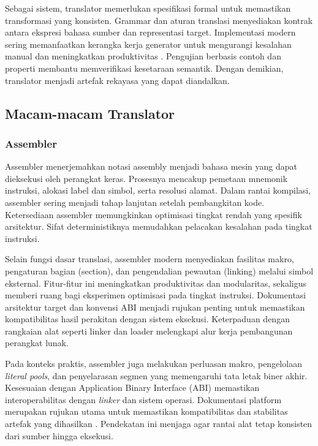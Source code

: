 \documentclass[../main.tex]{subfiles}
\begin{document}
Sebagai sistem, translator memerlukan spesifikasi formal untuk memastikan transformasi yang konsisten. Grammar dan aturan translasi menyediakan kontrak antara ekspresi bahasa sumber dan representasi target. Implementasi modern sering memanfaatkan kerangka kerja generator untuk mengurangi kesalahan manual dan meningkatkan produktivitas \citep{BisonManual,FlexManual,ANTLRDocs}. Pengujian berbasis contoh dan properti membantu memverifikasi kesetaraan semantik. Dengan demikian, translator menjadi artefak rekayasa yang dapat diandalkan.

\subsection{Macam-macam Translator}
\subsubsection{Assembler}
Assembler menerjemahkan notasi assembly menjadi bahasa mesin yang dapat dieksekusi oleh perangkat keras. Prosesnya mencakup pemetaan mnemonik instruksi, alokasi label dan simbol, serta resolusi alamat. Dalam rantai kompilasi, assembler sering menjadi tahap lanjutan setelah pembangkitan kode. Ketersediaan assembler memungkinkan optimisasi tingkat rendah yang spesifik arsitektur. Sifat deterministiknya memudahkan pelacakan kesalahan pada tingkat instruksi.

Selain fungsi dasar translasi, assembler modern menyediakan fasilitas makro, pengaturan bagian (section), dan pengendalian pewautan (linking) melalui simbol eksternal. Fitur-fitur ini meningkatkan produktivitas dan modularitas, sekaligus memberi ruang bagi eksperimen optimisasi pada tingkat instruksi. Dokumentasi arsitektur target dan konvensi ABI menjadi rujukan penting untuk memastikan kompatibilitas hasil perakitan dengan sistem eksekusi. Keterpaduan dengan rangkaian alat seperti linker dan loader melengkapi alur kerja pembangunan perangkat lunak.

Pada konteks praktis, assembler juga melakukan perluasan makro, pengelolaan \emph{literal pools}, dan penyelarasan segmen yang memengaruhi tata letak biner akhir. Kesesuaian dengan Application Binary Interface (ABI) memastikan interoperabilitas dengan \emph{linker} dan sistem operasi. Dokumentasi platform merupakan rujukan utama untuk memastikan kompatibilitas dan stabilitas artefak yang dihasilkan \citep{GCCInternals}. Pendekatan ini menjaga agar rantai alat tetap konsisten dari sumber hingga eksekusi.
\end{document}

